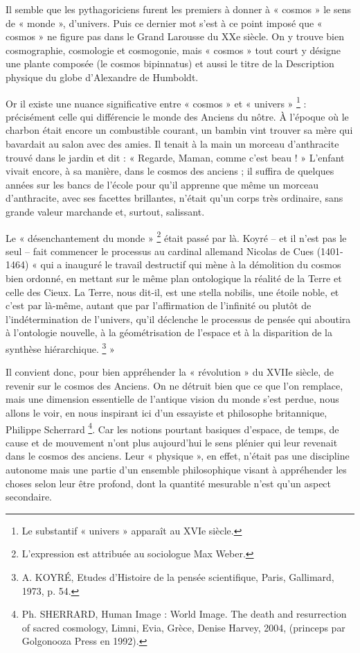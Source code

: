 \documentclass[a4paper,12pt]{article}
\begin{document}
Il semble que les pythagoriciens furent les premiers à donner à « cosmos » le sens de « monde », d'univers. Puis ce dernier mot s'est à ce point imposé que « cosmos » ne figure pas dans le Grand Larousse du XXe siècle. On y trouve bien cosmographie, cosmologie et cosmogonie, mais « cosmos » tout court y désigne une plante composée (le cosmos bipinnatus) et aussi le titre de la Description physique du globe d’Alexandre de Humboldt. 

Or il existe une nuance significative entre « cosmos » et « univers » \footnote{Le substantif « univers » apparaît au XVIe siècle.} : précisément celle qui différencie le monde des Anciens du nôtre. À l'époque où le charbon était encore un combustible courant, un bambin vint trouver sa mère qui bavardait au salon avec des amies. Il tenait à la main un morceau d'anthracite trouvé dans le jardin et dit : « Regarde, Maman, comme c’est beau ! » L'enfant vivait encore, à sa manière, dans le cosmos des anciens ; il suffira de quelques années sur les bancs de l'école pour qu'il apprenne que même un morceau d'anthracite, avec ses facettes brillantes, n'était qu'un corps très ordinaire, sans grande valeur marchande et, surtout, salissant.

Le « désenchantement du monde » \footnote{L’expression est attribuée au sociologue Max Weber.} était passé par là. Koyré – et il n'est pas le seul – fait commencer le processus au cardinal allemand Nicolas de Cues (1401-1464) « qui a inauguré le travail destructif qui mène à la démolition du cosmos bien ordonné, en mettant sur le même plan ontologique la réalité de la Terre et celle des Cieux. La Terre, nous dit-il, est une stella nobilis, une étoile noble, et c'est par là-même, autant que par l'affirmation de l'infinité ou plutôt de l'indétermination de l'univers, qu'il déclenche le processus de pensée qui aboutira à l'ontologie nouvelle, à la géométrisation de l'espace et à la disparition de la synthèse hiérarchique. \footnote{A. KOYRÉ, Etudes d’Histoire de la pensée scientifique, Paris, Gallimard, 1973, p. 54.} » 

Il convient donc, pour bien appréhender la « révolution » du XVIIe siècle, de revenir sur le cosmos des Anciens. On ne détruit bien que ce que l'on remplace, mais une dimension essentielle de l'antique vision du monde s'est perdue, nous allons le voir, en nous inspirant ici d'un essayiste et philosophe britannique, Philippe Scherrard \footnote{Ph. SHERRARD, Human Image : World Image. The death and resurrection of sacred cosmology, Limni, Evia, Grèce, Denise Harvey, 2004, (princeps par Golgonooza Press en 1992).}. Car les notions pourtant basiques d'espace, de temps, de cause et de mouvement n'ont plus aujourd'hui le sens plénier qui leur revenait dans le cosmos des anciens. Leur « physique », en effet, n'était pas une discipline autonome mais une partie d'un ensemble philosophique visant à appréhender les choses selon leur être profond, dont la quantité mesurable n'est qu'un aspect secondaire.
\end{document}
